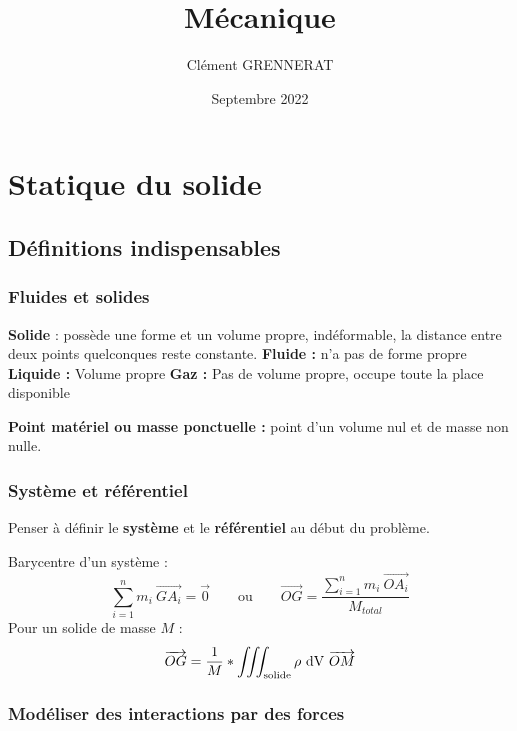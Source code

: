 \documentclass[13pt, twoside, a4paper, french]{report}
\newcommand*{\getSubject}{Mécanique}
\begin{document}
\title{\getSubject}
\author{Clément GRENNERAT}
\date{Septembre 2022}


\chapter{Statique du solide}\label{ch:statique-du-solide}
  
  
  \section{Définitions indispensables}\label{sec:definitions-indispensables}
    
    \subsection{Fluides et solides}\label{subsec:fluides-et-solides}
      
      \begin{outline}
        \1 \textbf{Solide} : possède une forme et un volume propre, indéformable, la distance entre deux points quelconques reste constante.
        \1 \textbf{Fluide :} n'a pas de forme propre
        \2 \textbf{Liquide :} Volume propre
        \2 \textbf{Gaz :} Pas de volume propre, occupe toute la place disponible
      \end{outline}
      
      \textbf{Point matériel ou masse ponctuelle :} point d'un volume nul et de masse non nulle.
    
    \subsection{Système et référentiel}\label{subsec:systeme-et-referentiel}
      
      Penser à définir le \textbf{système} et le \textbf{référentiel} au début du problème.
      
      Barycentre d'un système :
      \[\sum_{i=1}^n m_i\ \overrightarrow{GA_i} = \overrightarrow{0} \qquad \text{ou} \qquad \overrightarrow{OG} = \dfrac{\sum_{i=1}^n m_i\ \overrightarrow{OA_i}}{M_{total}}\]
      Pour un solide de masse $M$ :
      \[\overrightarrow{OG} = \dfrac{1}{M} * \iiint_{\text{solide}} {\rho\ \rm d V\ \overrightarrow{OM}} \]
    
    \subsection{Modéliser des interactions par des forces}\label{subsec:modeliser-des-interactions-par-des-forces}
      
\end{document}
